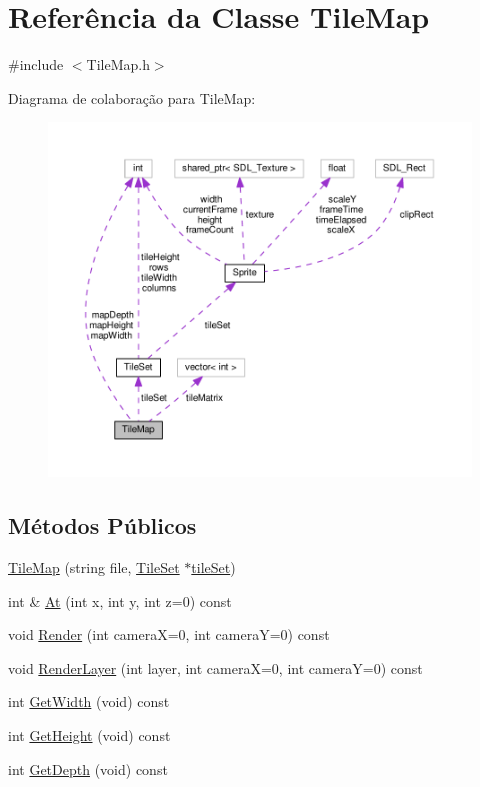 \hypertarget{classTileMap}{\section{Referência da Classe Tile\+Map}
\label{classTileMap}
}


{\ttfamily \#include $<$Tile\+Map.\+h$>$}



Diagrama de colaboração para Tile\+Map\+:\nopagebreak
\begin{figure}[H]
\begin{center}
\leavevmode
\includegraphics[width=350pt]{classTileMap__coll__graph}
\end{center}
\end{figure}
\subsection*{Métodos Públicos}
\begin{DoxyCompactItemize}
\item 
\hyperlink{classTileMap_acf6fe3a182047153ec9c25fadc55056c}{Tile\+Map} (string file, \hyperlink{classTileSet}{Tile\+Set} $\ast$\hyperlink{classTileMap_a24b2ea7aecfd795f1e13dfa9b0b3cb76}{tile\+Set})
\item 
int \& \hyperlink{classTileMap_a3b8dec192ee9ccca2b4476821235cc0a}{At} (int x, int y, int z=0) const 
\item 
void \hyperlink{classTileMap_a7ec4f6245f0e772c256f5b9240ce67ee}{Render} (int camera\+X=0, int camera\+Y=0) const 
\item 
void \hyperlink{classTileMap_a08748800b6fb6bd307acd3693a39d679}{Render\+Layer} (int layer, int camera\+X=0, int camera\+Y=0) const 
\item 
int \hyperlink{classTileMap_a072dbe1dbd793712baefe154c3058ab2}{Get\+Width} (void) const 
\item 
int \hyperlink{classTileMap_a9fe48260088655aa252b4d40e60f1390}{Get\+Height} (void) const 
\item 
int \hyperlink{classTileMap_aeb8c6a4101e449c33d963041345d918e}{Get\+Depth} (void) const 
\end{DoxyCompactItemize}
